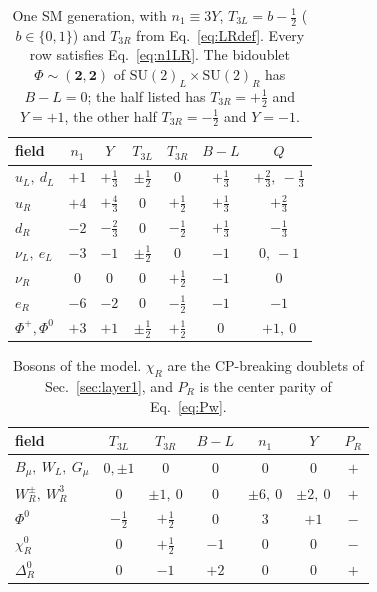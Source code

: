 \documentclass[submission, Phys]{SciPost}
\newcommand{\SU}{\mathrm{SU}}
\newcommand{\PR}{P_R}
\begin{document}
\begin{table}[t]
\centering
\caption{One SM generation, with $n_1\equiv3Y$, $T_{3L}=b-\tfrac12$
($b\in\{0,1\}$) and $T_{3R}$ from Eq.~\eqref{eq:LRdef}. Every row
satisfies Eq.~\eqref{eq:n1LR}. The bidoublet $\Phi\sim(\mathbf2,\mathbf2)$
of $\SU(2)_L\times\SU(2)_R$ has $B-L=0$; the half listed has
$T_{3R}=+\tfrac12$ and $Y=+1$, the other half $T_{3R}=-\tfrac12$ and
$Y=-1$.}
\label{tab:dict}
\renewcommand{\arraystretch}{1.25}
\begin{tabular}{lcccccc}
\toprule
field & $n_1$ & $Y$ & $T_{3L}$ & $T_{3R}$ & $B-L$ & $Q$ \\
\midrule
$u_L,\ d_L$   & $+1$ & $+\tfrac13$ & $\pm\tfrac12$ & $0$ & $+\tfrac13$ & $+\tfrac23,\ -\tfrac13$\\
$u_R$         & $+4$ & $+\tfrac43$ & $0$ & $+\tfrac12$ & $+\tfrac13$ & $+\tfrac23$\\
$d_R$         & $-2$ & $-\tfrac23$ & $0$ & $-\tfrac12$ & $+\tfrac13$ & $-\tfrac13$\\
$\nu_L,\ e_L$ & $-3$ & $-1$ & $\pm\tfrac12$ & $0$ & $-1$ & $0,\ -1$\\
$\nu_R$       & $0$  & $0$  & $0$ & $+\tfrac12$ & $-1$ & $0$\\
$e_R$         & $-6$ & $-2$ & $0$ & $-\tfrac12$ & $-1$ & $-1$\\
$\Phi^{+},\Phi^{0}$ & $+3$ & $+1$ & $\pm\tfrac12$ & $+\tfrac12$ & $0$ & $+1,\ 0$\\
\bottomrule
\end{tabular}
\end{table}

\begin{table}[t]
\centering
\caption{Bosons of the model. $\chi_R$ are the CP-breaking doublets
of Sec.~\ref{sec:layer1}, and $\PR$ is the center parity of
Eq.~\eqref{eq:Pw}.}
\label{tab:bosons}
\renewcommand{\arraystretch}{1.25}
\begin{tabular}{lcccccc}
\toprule
field & $T_{3L}$ & $T_{3R}$ & $B-L$ & $n_1$ & $Y$ & $\PR$ \\
\midrule
$B_\mu,\ W_L,\ G_\mu$ & $0,\pm1$ & $0$ & $0$ & $0$ & $0$ & $+$\\
$W_R^{\pm},\ W_R^3$   & $0$ & $\pm1,\ 0$ & $0$ & $\pm6,\ 0$ & $\pm2,\ 0$ & $+$\\
$\Phi^{0}$            & $-\tfrac12$ & $+\tfrac12$ & $0$ & $3$ & $+1$ & $-$\\
$\chi_R^{0}$          & $0$ & $+\tfrac12$ & $-1$ & $0$ & $0$ & $-$\\
$\Delta_R^{0}$        & $0$ & $-1$ & $+2$ & $0$ & $0$ & $+$\\
\bottomrule
\end{tabular}
\end{table}
\end{document}
